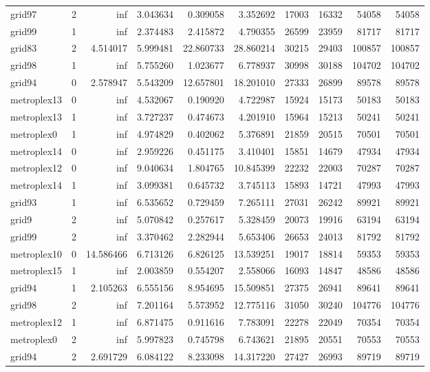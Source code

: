 \begin{longtable}{|l|r|r|r|r|r|r|r|r|r|}
grid97 & 2 & inf & 3.043634 & 0.309058 & 3.352692 & 17003 & 16332 & 54058 & 54058 \\
grid99 & 1 & inf & 2.374483 & 2.415872 & 4.790355 & 26599 & 23959 & 81717 & 81717 \\
grid83 & 2 & 4.514017 & 5.999481 & 22.860733 & 28.860214 & 30215 & 29403 & 100857 & 100857 \\
grid98 & 1 & inf & 5.755260 & 1.023677 & 6.778937 & 30998 & 30188 & 104702 & 104702 \\
grid94 & 0 & 2.578947 & 5.543209 & 12.657801 & 18.201010 & 27333 & 26899 & 89578 & 89578 \\
metroplex13 & 0 & inf & 4.532067 & 0.190920 & 4.722987 & 15924 & 15173 & 50183 & 50183 \\
metroplex13 & 1 & inf & 3.727237 & 0.474673 & 4.201910 & 15964 & 15213 & 50241 & 50241 \\
metroplex0 & 1 & inf & 4.974829 & 0.402062 & 5.376891 & 21859 & 20515 & 70501 & 70501 \\
metroplex14 & 0 & inf & 2.959226 & 0.451175 & 3.410401 & 15851 & 14679 & 47934 & 47934 \\
metroplex12 & 0 & inf & 9.040634 & 1.804765 & 10.845399 & 22232 & 22003 & 70287 & 70287 \\
metroplex14 & 1 & inf & 3.099381 & 0.645732 & 3.745113 & 15893 & 14721 & 47993 & 47993 \\
grid93 & 1 & inf & 6.535652 & 0.729459 & 7.265111 & 27031 & 26242 & 89921 & 89921 \\
grid9 & 2 & inf & 5.070842 & 0.257617 & 5.328459 & 20073 & 19916 & 63194 & 63194 \\
grid99 & 2 & inf & 3.370462 & 2.282944 & 5.653406 & 26653 & 24013 & 81792 & 81792 \\
metroplex10 & 0 & 14.586466 & 6.713126 & 6.826125 & 13.539251 & 19017 & 18814 & 59353 & 59353 \\
metroplex15 & 1 & inf & 2.003859 & 0.554207 & 2.558066 & 16093 & 14847 & 48586 & 48586 \\
grid94 & 1 & 2.105263 & 6.555156 & 8.954695 & 15.509851 & 27375 & 26941 & 89641 & 89641 \\
grid98 & 2 & inf & 7.201164 & 5.573952 & 12.775116 & 31050 & 30240 & 104776 & 104776 \\
metroplex12 & 1 & inf & 6.871475 & 0.911616 & 7.783091 & 22278 & 22049 & 70354 & 70354 \\
metroplex0 & 2 & inf & 5.997823 & 0.745798 & 6.743621 & 21895 & 20551 & 70553 & 70553 \\
grid94 & 2 & 2.691729 & 6.084122 & 8.233098 & 14.317220 & 27427 & 26993 & 89719 & 89719 \\

\end{longtable}
